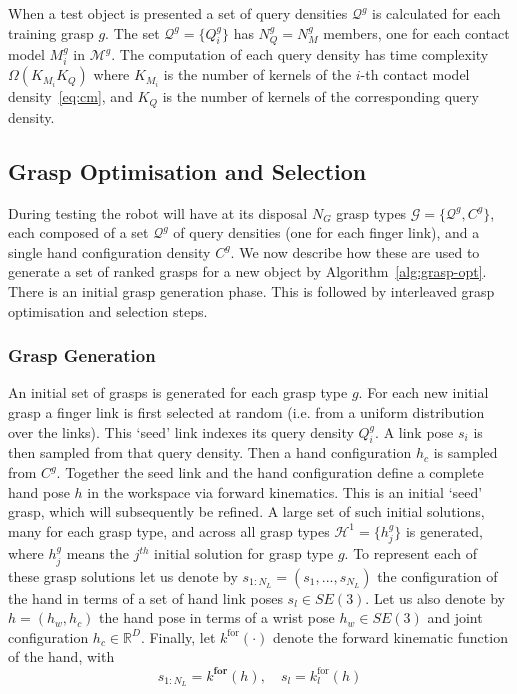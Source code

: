\documentclass[a4paper, 10pt, conference]{ieeeconf}      %
\newcommand{\alg}{Algorithm~}
\newcommand{\hc}{C}
\newcommand{\qd}{Q}
\begin{document}
When a test object is presented a set of query densities $\mathcal{Q}^g$ is calculated for each training grasp $g$. The set $\mathcal{Q}^g =\{\qd_i^g\}$ has $N^g_Q=N^g_M$ members, one for each contact model $M_i^g$ in $\mathcal{M}^g$. The computation of each  query density has time complexity $\Omega( K_{M_i} K_Q)$ where $K_{M_i}$ is the number of kernels of the $i$-th contact model density~\eqref{eq:cm}, and $K_Q$ is the number of kernels of the corresponding query density. 


\subsection{Grasp Optimisation and Selection}
\label{sec:optimisation}
During testing the robot will have at its disposal $N_G$ grasp types $\mathcal{G}=\{\mathcal{Q}^{g},C^g\}$, each composed of a set $\mathcal{Q}^{g}$ of query densities (one for each finger link), and a single hand configuration density $C^g$. We now describe how these are used to generate a set of ranked grasps for a new object by \alg\ref{alg:grasp-opt}. There is an initial grasp generation phase. This is followed by interleaved grasp optimisation and selection steps. 

\subsubsection{Grasp Generation} 
An initial set of grasps is generated for each grasp type $g$. For each new initial grasp a finger link is first selected at random (i.e. from a uniform distribution over the links). This ‘seed’ link indexes its query density $\qd_i^g$. A link pose $s_i$ is then sampled from that query density. Then a hand configuration $h_c$ is sampled from $\hc^g$. Together the seed link and the hand configuration define a complete hand pose $h$ in the workspace via forward kinematics. This is an initial `seed' grasp, which will subsequently be refined. A large set of such initial solutions, many for each grasp type, and across all grasp types $\mathcal{H}^{1} = \{h^g_j\}$ is generated, where $h^g_j$ means the $j^{th}$ initial solution for  grasp type $g$. To represent each of these grasp solutions let us denote by $s_{1:N_L} = (s_1, ..., s_{N_L})$ the configuration of the hand in terms of a set of hand link poses $s_l \in SE(3)$. Let us also denote by $h = (h_w, h_c)$ the hand pose in terms of a wrist pose $h_w \in SE(3)$ and joint configuration $h_c \in \mathbb R^D$. Finally, let $k^{\mathrm{for}}(\cdot)$ denote the forward kinematic function of the hand, with
\begin{equation}
s_{1:N_L}= k^\mathbf{for}(h), \quad s_l = k_l^{\mathrm{for}}(h)
\end{equation}
\end{document}
